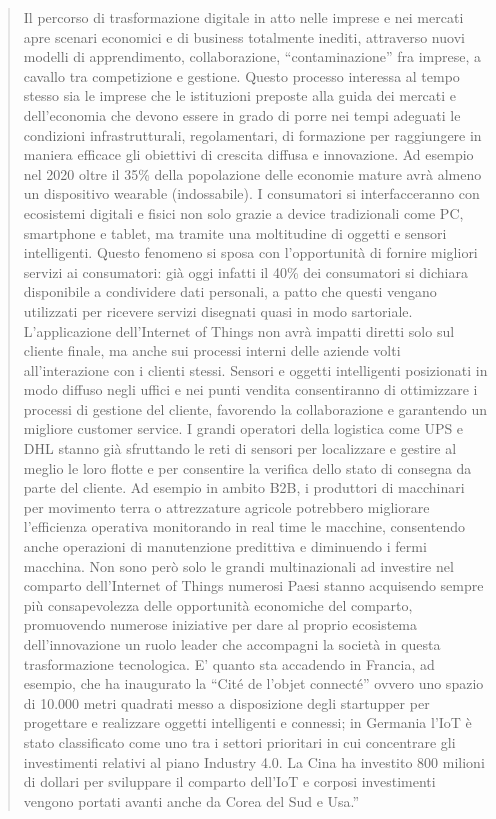 \documentclass[a4paper]{report} %
\begin{document}
\begin{quote}
	Il percorso di trasformazione digitale in atto nelle imprese e nei mercati apre scenari economici e di business totalmente inediti, attraverso nuovi modelli di apprendimento, collaborazione, “contaminazione” fra imprese, a cavallo tra competizione e gestione. Questo processo interessa al tempo stesso sia le imprese che le istituzioni preposte alla guida dei mercati e dell’economia che devono essere in grado di porre nei tempi adeguati le condizioni infrastrutturali, regolamentari, di formazione per raggiungere in maniera efficace gli obiettivi di crescita diffusa e innovazione. Ad esempio nel 2020 oltre il 35\% della popolazione delle economie mature avrà almeno un dispositivo wearable (indossabile). I consumatori si interfacceranno con ecosistemi digitali e fisici non solo grazie a device tradizionali come PC, smartphone e tablet, ma tramite una moltitudine di oggetti e sensori intelligenti. Questo fenomeno si sposa con l’opportunità di fornire migliori servizi ai consumatori: già oggi infatti il 40\% dei consumatori si dichiara disponibile a condividere dati personali, a patto che questi vengano utilizzati per ricevere servizi disegnati quasi in modo sartoriale. L’applicazione dell’Internet of Things non avrà impatti diretti solo sul cliente finale, ma anche sui processi interni delle aziende volti all’interazione con i clienti stessi. Sensori e oggetti intelligenti posizionati in modo diffuso negli uffici e nei punti vendita consentiranno di ottimizzare i processi di gestione del cliente, favorendo la collaborazione e garantendo un migliore customer service. I grandi operatori della logistica come UPS e DHL stanno già sfruttando le reti di sensori per localizzare e gestire al meglio le loro flotte e per consentire la verifica dello stato di consegna da parte del cliente. Ad esempio in ambito B2B, i produttori di macchinari per movimento terra o attrezzature agricole potrebbero migliorare l’efficienza operativa monitorando in real time le macchine, consentendo anche operazioni di manutenzione predittiva e diminuendo i fermi macchina. 
	Non sono però solo le grandi multinazionali ad investire nel comparto dell’Internet of Things numerosi Paesi stanno acquisendo sempre più consapevolezza delle opportunità economiche del comparto, promuovendo numerose iniziative per dare al proprio ecosistema dell’innovazione un ruolo leader che accompagni la società in questa trasformazione tecnologica. E’ quanto sta accadendo in Francia, ad esempio, che ha inaugurato la “Cité de l’objet connecté” ovvero uno spazio di 10.000 metri quadrati messo a disposizione degli startupper per progettare e realizzare oggetti intelligenti e connessi; in Germania l’IoT è stato  classificato come uno tra i settori prioritari in cui concentrare gli investimenti relativi al piano Industry 4.0. La Cina ha investito 800 milioni di dollari per sviluppare il comparto dell’IoT e corposi investimenti vengono portati avanti anche da Corea del Sud e Usa.'' 
\end{quote} 
\end{document}
